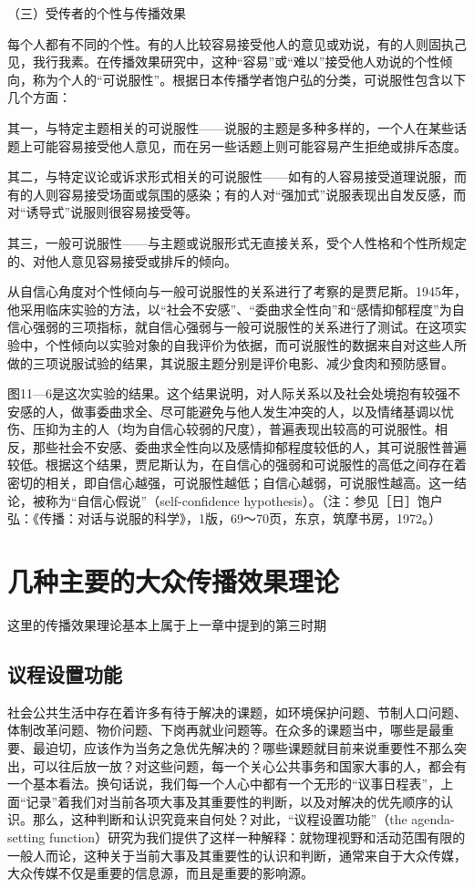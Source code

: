 \documentclass[UTF8,12pt]{ctexart}
\numberwithin{equation}{section} %
\numberwithin{figure}{section}
\numberwithin{table}{section}
\begin{document}
	（三）受传者的个性与传播效果
	
	每个人都有不同的个性。有的人比较容易接受他人的意见或劝说，有的人则固执己见，我行我素。在传播效果研究中，这种“容易”或“难以”接受他人劝说的个性倾向，称为个人的“可说服性”。根据日本传播学者饱户弘的分类，可说服性包含以下几个方面：
	
	其一，与特定主题相关的可说服性——说服的主题是多种多样的，一个人在某些话题上可能容易接受他人意见，而在另一些话题上则可能容易产生拒绝或排斥态度。
	
	其二，与特定议论或诉求形式相关的可说服性——如有的人容易接受道理说服，而有的人则容易接受场面或氛围的感染；有的人对“强加式”说服表现出自发反感，而对“诱导式”说服则很容易接受等。
	
	其三，一般可说服性——与主题或说服形式无直接关系，受个人性格和个性所规定的、对他人意见容易接受或排斥的倾向。
	
	从自信心角度对个性倾向与一般可说服性的关系进行了考察的是贾尼斯。1945年，他采用临床实验的方法，以“社会不安感”、“委曲求全性向”和“感情抑郁程度”为自信心强弱的三项指标，就自信心强弱与一般可说服性的关系进行了测试。在这项实验中，个性倾向以实验对象的自我评价为依据，而可说服性的数据来自对这些人所做的三项说服试验的结果，其说服主题分别是评价电影、减少食肉和预防感冒。
	
	图11—6是这次实验的结果。这个结果说明，对人际关系以及社会处境抱有较强不安感的人，做事委曲求全、尽可能避免与他人发生冲突的人，以及情绪基调以忧伤、压抑为主的人（均为自信心较弱的尺度），普遍表现出较高的可说服性。相反，那些社会不安感、委曲求全性向以及感情抑郁程度较低的人，其可说服性普遍较低。根据这个结果，贾尼斯认为，在自信心的强弱和可说服性的高低之间存在着密切的相关，即自信心越强，可说服性越低；自信心越弱，可说服性越高。这一结论，被称为“自信心假说”（self-confidence hypothesis）。（注：参见［日］饱户弘：《传播：对话与说服的科学》，1版，69～70页，东京，筑摩书房，1972。）
	
	\section{几种主要的大众传播效果理论}
	这里的传播效果理论基本上属于上一章中提到的第三时期
	
	\subsection{议程设置功能}
	社会公共生活中存在着许多有待于解决的课题，如环境保护问题、节制人口问题、体制改革问题、物价问题、下岗再就业问题等。在众多的课题当中，哪些是最重要、最迫切，应该作为当务之急优先解决的？哪些课题就目前来说重要性不那么突出，可以往后放一放？对这些问题，每一个关心公共事务和国家大事的人，都会有一个基本看法。换句话说，我们每一个人心中都有一个无形的“议事日程表”，上面“记录”着我们对当前各项大事及其重要性的判断，以及对解决的优先顺序的认识。那么，这种判断和认识究竟来自何处？对此，“议程设置功能”（the agenda-setting function）研究为我们提供了这样一种解释：就物理视野和活动范围有限的一般人而论，这种关于当前大事及其重要性的认识和判断，通常来自于大众传媒，大众传媒不仅是重要的信息源，而且是重要的影响源。
	
\end{document}
